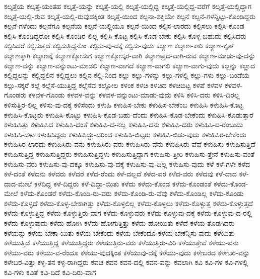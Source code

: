 {ಕಲ್ಕತ್ತೆಯ
ಕಲ್ಕತ್ತೆ-ಯಂತಹ
ಕಲ್ಕತ್ತೆ-ಯನ್ನು
ಕಲ್ಕತ್ತೆ-ಯಲ್ಲಿ
ಕಲ್ಕತ್ತೆ-ಯಲ್ಲಿದ್ದ
ಕಲ್ಕತ್ತೆ-ಯಲ್ಲಿದ್ದ-ವರೆಗೆ
ಕಲ್ಕತ್ತೆ-ಯಲ್ಲಿದ್ದಾಗ
ಕಲ್ಕತ್ತೆ-ಯಲ್ಲಿ-ರುವ
ಕಲ್ಕತ್ತೆ-ಯಲ್ಲಿ-ರುವುದಕ್ಕಿಂತ
ಕಲ್ಕತ್ತೆ-ಯಿಂದ
ಕಲ್ಪನಾ-ಶಕ್ತಿಯೇ
ಕಲ್ಪನೆ
ಕಲ್ಪನೆ-ಗಳನ್ನಿಟ್ಟು-ಕೊಂಡಿದ್ದರು
ಕಲ್ಪನೆ-ಗಳೆಂದು
ಕಲ್ಪನೆಗೂ
ಕಲ್ಪನೆಯ
ಕಲ್ಪನೆ-ಯಲ್ಲಿಯೂ
ಕಲ್ಪನೆ-ಯಿಂದ
ಕಲ್ಪಿಸ-ಲಾರದು
ಕಲ್ಪಿಸಲು
ಕಲ್ಪಿಸಿ-ಕೊಂಡ
ಕಲ್ಪಿಸಿ-ಕೊಂಡಿದ್ದರೋ
ಕಲ್ಪಿಸಿ-ಕೊಂಡಿರ-ಲಿಲ್ಲ
ಕಲ್ಪಿಸಿ-ಕೊಟ್ಟ
ಕಲ್ಪಿಸಿ-ಕೊಡ-ಬೇಕು
ಕಲ್ಪಿಸಿ-ಕೊಳ್ಳ-ಬಹುದು
ಕಲ್ಪಿಸಿದರು
ಕಲ್ಪಿಸಿದರೆ
ಕಲ್ಪಿಸುತ್ತದೆ
ಕಲ್ಪಿಸುತ್ತಿದ್ದನೋ
ಕಲ್ಪಿಸು-ವು-ದಕ್ಕೆ
ಕಲ್ಪಿಸು-ವುದು
ಕಲ್ಯಾಣ
ಕಲ್ಯಾಣ-ಕಾರಿ
ಕಲ್ಯಾಣ-ಕೃತ್
ಕಲ್ಯಾಣಕ್ಕಾಗಿ
ಕಲ್ಯಾಣಕ್ಕೆ
ಕಲ್ಯಾಣಕ್ಕೋಸುಗ
ಕಲ್ಯಾಣಕ್ಕೋಸ್ಕರ-ವಾಗಿ
ಕಲ್ಯಾಣಪ್ರದ-ವಾಗಿ-ರುವ
ಕಲ್ಯಾಣ-ಮಾಡು-ವು-ದನ್ನು
ಕಲ್ಯಾಣ-ವನ್ನು
ಕಲ್ಯಾಣ-ವನ್ನುಂಟು-ಮಾಡಲಿ
ಕಲ್ಯಾಣ-ವಾಗದೆ
ಕಲ್ಯಾಣ-ವಾಗಲಿ
ಕಲ್ಯಾಣ-ವಾಗು-ವುದು
ಕಲ್ಲನ್ನು
ಕಲ್ಲಾದ
ಕಲ್ಲಿದ್ದಲನ್ನು
ಕಲ್ಲಿದ್ದಲಿನ
ಕಲ್ಲಿದ್ದಲು
ಕಲ್ಲಿನ
ಕಲ್ಲಿ-ನಿಂದ
ಕಲ್ಲು
ಕಲ್ಲು-ಗಳನ್ನು
ಕಲ್ಲು-ಗಳಲ್ಲಿ
ಕಲ್ಲು-ಗಳು
ಕಲ್ಲು-ಬಂಡೆಯ
ಕಲ್ಲು-ಸಕ್ಕರೆ
ಕಲ್ಲೆ
ಕಲ್ಲೆಸೆ-ಯುತ್ತಿದ್ದ
ಕಲ್ಲೆಸೆವ
ಕಲ್ಲೋಲ
ಕಳಂಕ
ಕಳಚಿ
ಕಳಚಿದ
ಕಳಚಿಬಿಟ್ಟ
ಕಳಪೆ
ಕಳವಳ
ಕಳವಳ-ಗೊಂಡರು
ಕಳವಳ-ಗೊಂಡು
ಕಳವಳ-ವನ್ನು
ಕಳವಳ-ವನ್ನುಂಟು-ಮಾಡು-ವುದು
ಕಳಿಸಿ
ಕಳಿಸಿ-ದರು
ಕಳಿಸಿ-ದಿರಲ್ಲ
ಕಳಿಸುತ್ತಿರ-ಲಿಲ್ಲ
ಕಳಿಸು-ವು-ದಕ್ಕೆ
ಕಳಿಸೆಂದು
ಕಳುಹಿ
ಕಳುಹಿಸ-ಬೇಕು
ಕಳುಹಿಸ-ಬೇಕೆಂಬ
ಕಳುಹಿಸಿ
ಕಳುಹಿಸಿ-ಕೊಟ್ಟ
ಕಳುಹಿಸಿ-ಕೊಟ್ಟರು
ಕಳುಹಿಸಿ-ಕೊಟ್ಟು
ಕಳುಹಿಸಿ-ಕೊಡ-ಬಹು-ದೆಂದು
ಕಳುಹಿಸಿ-ಕೊಡ-ಬೇಕೆಂದು
ಕಳುಹಿಸಿ-ಕೊಡುತ್ತಾರೆ
ಕಳುಹಿಸಿತ್ತು
ಕಳುಹಿಸಿದ
ಕಳುಹಿಸಿ-ದಂತೆ
ಕಳುಹಿಸಿ-ದ-ನಲ್ಲ
ಕಳುಹಿಸಿ-ದನು
ಕಳುಹಿಸಿ-ದರು
ಕಳುಹಿಸಿ-ದ-ರೆಂಬುದು
ಕಳುಹಿಸಿ-ದಳು
ಕಳುಹಿಸಿದ್ದರು
ಕಳುಹಿಸಿದ್ದು-ದರಿಂದ
ಕಳುಹಿಸಿ-ಬಿಟ್ಟರು
ಕಳುಹಿಸಿ-ಬಿಡು-ವುದು
ಕಳುಹಿಸಿರ-ಬೇಕೆಂದು
ಕಳುಹಿಸಿರ-ಲಾರದು
ಕಳುಹಿಸಿರು-ವನು
ಕಳುಹಿಸಿರು-ವರು
ಕಳುಹಿಸಿರು-ವೆನು
ಕಳುಹಿಸಿರು-ವೆವೆ
ಕಳುಹಿಸು
ಕಳುಹಿಸುತ್ತಿದೆ
ಕಳುಹಿಸುತ್ತಿದ್ದ
ಕಳುಹಿಸುತ್ತಿದ್ದರು
ಕಳುಹಿಸುತ್ತಿದ್ದಳು
ಕಳುಹಿಸುತ್ತಿದ್ದಾಗ
ಕಳುಹಿಸು-ತ್ತೀರಿ
ಕಳುಹಿಸು-ತ್ತೇನೆ
ಕಳುಹಿಸು-ವಂತೆ
ಕಳುಹಿಸು-ವರು
ಕಳುಹಿಸು-ವು-ದಕ್ಕೂ
ಕಳುಹಿಸು-ವು-ದಕ್ಕೆ
ಕಳುಹಿಸು-ವು-ದಿಲ್ಲ
ಕಳುಹಿಸು-ವುದು
ಕಳೆ
ಕಳೆ-ಗಳೇ
ಕಳೆದ
ಕಳೆ-ದಂತೆ
ಕಳೆದನು
ಕಳೆದರು
ಕಳೆದರೆ
ಕಳೆದ-ರೆಂದು
ಕಳೆ-ದಲ್ಲದೆ
ಕಳೆದ-ವರ
ಕಳೆದ-ವರು
ಕಳೆದವು
ಕಳೆ-ದಾದ
ಕಳೆ-ದಾದ-ಮೇಲೆ
ಕಳೆದಿದ್ದ
ಕಳೆ-ದಿದ್ದರು
ಕಳೆ-ದಿದ್ದಾ-ಯಿತು
ಕಳೆದು
ಕಳೆದು-ಕೊಂಡ
ಕಳೆದು-ಕೊಂಡಂತೆ
ಕಳೆದು-ಕೊಂಡ-ಮೇಲೆ
ಕಳೆದು-ಕೊಂಡರೆ
ಕಳೆದು-ಕೊಂಡಿ-ರು-ವರು
ಕಳೆದು-ಕೊಂಡಿ-ರು-ವೆವು
ಕಳೆದು-ಕೊಂಡಿಲ್ಲ
ಕಳೆದು-ಕೊಂಡು
ಕಳೆದು-ಕೊಳ್ಳದೆ
ಕಳೆದು-ಕೊಳ್ಳ-ಬೇಕಾಗಿತ್ತು
ಕಳೆದು-ಕೊಳ್ಳಲಿಲ್ಲ
ಕಳೆದು-ಕೊಳ್ಳಲು
ಕಳೆದು-ಕೊಳ್ಳುತ್ತ
ಕಳೆದು-ಕೊಳ್ಳುತ್ತದೆ
ಕಳೆದು-ಕೊಳ್ಳುತ್ತಿದ್ದ
ಕಳೆದು-ಕೊಳ್ಳುತ್ತಿರು-ವಾಗ
ಕಳೆದು-ಕೊಳ್ಳುವರು
ಕಳೆದು-ಕೊಳ್ಳುವು-ದಕ್ಕೆ
ಕಳೆದು-ಕೊಳ್ಳುವು-ದ-ರಲ್ಲಿ
ಕಳೆದು-ಕೊಳ್ಳುವುದು
ಕಳೆದು-ಹೋಗಿ
ಕಳೆದು-ಹೋಗುತ್ತಿತ್ತು
ಕಳೆದು-ಹೋಯಿತು
ಕಳೆದೆ
ಕಳೆಯ-ತೊಡಗಿದರು
ಕಳೆಯನ್ನು
ಕಳೆಯ-ಬೇಕಾ-ಯಿತು
ಕಳೆಯ-ಬೇಕೆಂದು
ಕಳೆಯ-ಬೇಕೆಂದೂ
ಕಳೆಯ-ಬೇಕೆನ್ನಿಸು-ವುದು
ಕಳೆಯಿತು
ಕಳೆಯುತ್ತಿದೆ
ಕಳೆಯುತ್ತಿದ್ದ
ಕಳೆಯುತ್ತಿದ್ದರು
ಕಳೆಯುತ್ತಿರು-ವರು
ಕಳೆಯುತ್ತಿರು-ವಿರಿ
ಕಳೆಯುತ್ತೇವೆ
ಕಳೆಯು-ವನು
ಕಳೆಯು-ವರು
ಕಳೆಯು-ವ-ರೆಂದೂ
ಕಳೆಯು-ವುದಕ್ಕಿಂತ
ಕಳೆಯುವು-ದಕ್ಕೆ
ಕಳೆಯು-ವುದು
ಕಳೇಬರದ
ಕಳೇಬರ-ವನ್ನು
ಕಳೇಬರ-ವಿತ್ತು
ಕಳ್ಳ-ತನ
ಕಳ್ಳ-ರಾಗಿದ್ದರು
ಕವಚ
ಕವನ
ಕವನ-ದಲ್ಲಿ
ಕವನ-ವನ್ನು
ಕವಲಾಗಿ
ಕವಿ
ಕವಿ-ಗಳ
ಕವಿ-ಗಳಲ್ಲಿ
ಕವಿ-ಗಳು
ಕವಿತೆ
ಕವಿ-ದಿದೆ
ಕವಿ-ದಿರು-ವಾಗ
}

